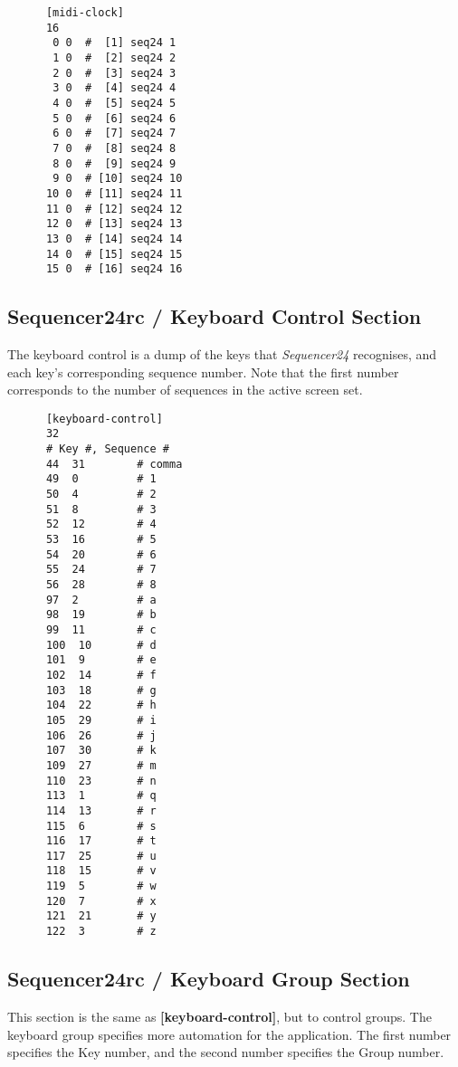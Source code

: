    \begin{verbatim}
      [midi-clock]
      16
       0 0  #  [1] seq24 1
       1 0  #  [2] seq24 2
       2 0  #  [3] seq24 3
       3 0  #  [4] seq24 4
       4 0  #  [5] seq24 5
       5 0  #  [6] seq24 6
       6 0  #  [7] seq24 7
       7 0  #  [8] seq24 8
       8 0  #  [9] seq24 9
       9 0  # [10] seq24 10
      10 0  # [11] seq24 11
      11 0  # [12] seq24 12
      12 0  # [13] seq24 13
      13 0  # [14] seq24 14
      14 0  # [15] seq24 15
      15 0  # [16] seq24 16
   \end{verbatim}

\subsection{Sequencer24rc / Keyboard Control Section}
\label{subsec:seq24_rc_file_keyboard_control}
        
   The keyboard control is a dump of the keys that \textsl{Sequencer24}
   recognises, and each key's corresponding sequence number.
   Note that the first number corresponds to the number of sequences in
   the active screen set.

   \begin{verbatim}
      [keyboard-control]
      32
      # Key #, Sequence # 
      44  31        # comma
      49  0         # 1
      50  4         # 2
      51  8         # 3
      52  12        # 4
      53  16        # 5
      54  20        # 6
      55  24        # 7
      56  28        # 8
      97  2         # a
      98  19        # b
      99  11        # c
      100  10       # d
      101  9        # e
      102  14       # f
      103  18       # g
      104  22       # h
      105  29       # i
      106  26       # j
      107  30       # k
      109  27       # m
      110  23       # n
      113  1        # q
      114  13       # r
      115  6        # s
      116  17       # t
      117  25       # u
      118  15       # v
      119  5        # w
      120  7        # x
      121  21       # y
      122  3        # z
   \end{verbatim}

\subsection{Sequencer24rc / Keyboard Group Section}
\label{subsec:seq24_rc_file_keyboard_group}

   This section is the same as
   \textbf{[keyboard-control]}, but to control groups.
   The keyboard group specifies more automation for the application.  The
   first number specifies the Key number, and the second number specifies
   the Group number.

